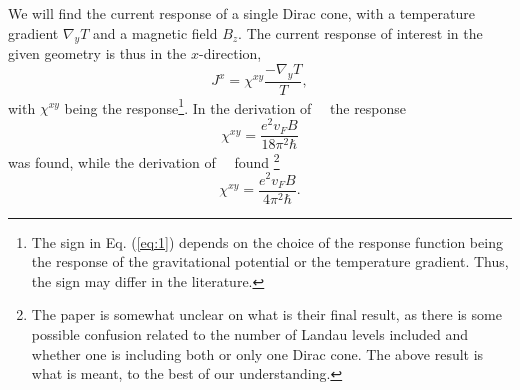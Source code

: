 We will find the current response of a single Dirac cone, with a temperature gradient $\nabla_y T$ and a magnetic field $B_z$.
The current response of interest in the given geometry is thus in the $x$-direction,
\begin{equation}\label{eq:1}
  J^x = \chi ^{xy} \frac{- \nabla _yT}{T},
\end{equation}
with $\chi^{xy}$  being the response\footnote{The sign in Eq. (\ref{eq:1}) depends on the choice of the response function being the response of the gravitational potential or the temperature gradient. Thus, the sign may differ in the literature.}.
In the derivation of~\citeauthor{chernodubGenerationNernstCurrent2018}~\cite{chernodubGenerationNernstCurrent2018} the response
\begin{equation}
  \chi ^{xy} = \frac{e^2 v_F B}{18 \pi ^2 \hbar }
\end{equation}
was found, while the derivation of~\citeauthor{arjonaFingerprintsConformalAnomaly2019}~\cite{arjonaFingerprintsConformalAnomaly2019} found
\footnote{The paper is somewhat unclear on what is their final result, as there is some possible confusion related to the number of Landau levels included and whether one is including both or only one Dirac cone.
The above result is what is meant, to the best of our understanding.}
\begin{equation}
  \chi ^{xy} = \frac{e^2 v_F B}{4 \pi ^2 \hbar }.
\end{equation}


